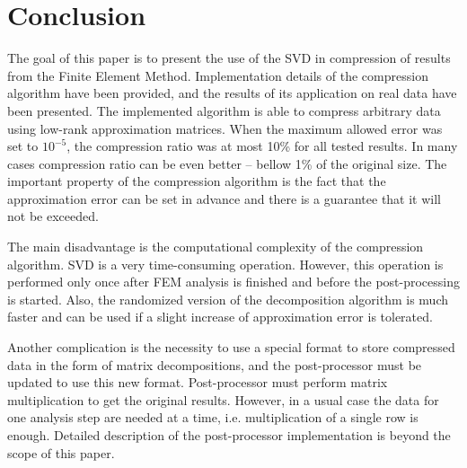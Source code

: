 \section{Conclusion}
\label{sec:conclusion}

The goal of this paper is to present the use of the SVD in compression of results from the Finite Element Method. Implementation details of the compression algorithm have been provided, and the results of its application on real data have been presented. The implemented algorithm is able to compress arbitrary data using low-rank approximation matrices. When the maximum allowed error was set to $10^{-5}$, the compression ratio was at most 10\% for all tested results. In many cases compression ratio can be even better -- bellow 1\% of the original size. The important property of the compression algorithm is the fact that the approximation error can be set in advance and there is a guarantee that it will not be exceeded.

The main disadvantage is the computational complexity of the compression algorithm. SVD is a very time-consuming operation. However, this operation is performed only once after FEM analysis is finished and before the post-processing is started. Also, the randomized version of the decomposition algorithm is much faster and can be used if a slight increase of approximation error is tolerated.

Another complication is the necessity to use a special format to store compressed data in the form of matrix decompositions, and the post-processor must be updated to use this new format. Post-processor must perform matrix multiplication to get the original results. However, in a usual case the data for one analysis step are needed at a time, i.e. multiplication of a single row is enough. Detailed description of the post-processor implementation is beyond the scope of this paper.
